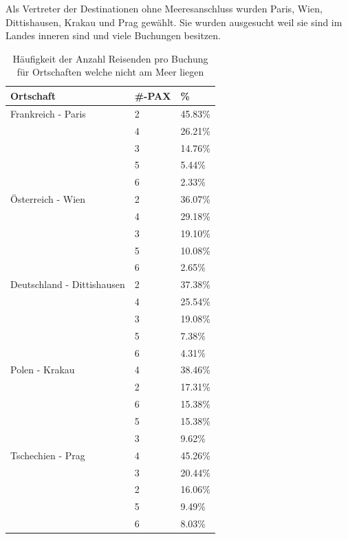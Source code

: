 Als Vertreter der Destinationen ohne Meeresanschluss wurden Paris, Wien, Dittishausen, Krakau und Prag gewählt. Sie wurden ausgesucht weil sie sind im Landes inneren sind und viele Buchungen besitzen. 
\begin{table}[H] 
	\caption{Häufigkeit der Anzahl Reisenden pro Buchung für Ortschaften welche nicht am Meer liegen}
	\centering
	\label{sec:testingfazit:testing:hypothesen:3}
	\begin{tabular}{ | l | l | l | } 
		\hline 
		\rowcolor{tableheadcolor}
		\bfseries Ortschaft & \bfseries \#-PAX & \bfseries \% \\ \hline 
		Frankreich - Paris & 2 & 45.83\% \\ \cline{2-3} 
		 & 4 & 26.21\% \\ \cline{2-3}
		 & 3 & 14.76\% \\ \cline{2-3} 
		 & 5 & 5.44\% \\ \cline{2-3}
		 & 6 & 2.33\% \\ \hline 
		Österreich - Wien & 2 & 36.07\% \\ \cline{2-3} 
		 & 4 & 29.18\% \\ \cline{2-3}
		 & 3 & 19.10\% \\ \cline{2-3} 
		 & 5 & 10.08\% \\ \cline{2-3}
		 & 6 & 2.65\% \\ \hline 
		Deutschland - Dittishausen & 2 & 37.38\% \\ \cline{2-3}
		& 4 & 25.54\% \\ \cline{2-3} 
		& 3 & 19.08\% \\ \cline{2-3}
		& 5 & 7.38\% \\ \cline{2-3}
		& 6 & 4.31\% \\ \hline 
		Polen - Krakau & 4 & 38.46\% \\ \cline{2-3}
		& 2 & 17.31\% \\ \cline{2-3} 
		& 6 & 15.38\% \\ \cline{2-3}
		& 5 & 15.38\% \\ \cline{2-3}
		& 3 & 9.62\% \\ \hline 
		Tschechien - Prag & 4 & 45.26\% \\ \cline{2-3} 
		& 3 & 20.44\% \\ \cline{2-3}
		& 2 & 16.06\% \\ \cline{2-3} 
		& 5 & 9.49\% \\ \cline{2-3}
		& 6 & 8.03\% \\ \hline 
	\end{tabular}
\end{table}

